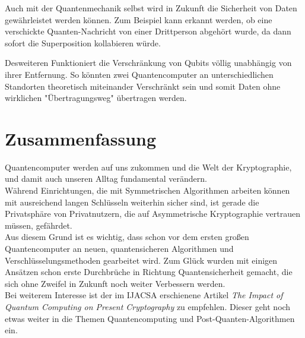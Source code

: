 \documentclass[12pt]{IEEEtran}
\begin{document}
Auch mit der Quantenmechanik selbst wird in Zukunft die Sicherheit von Daten gewährleistet werden können. Zum Beispiel kann erkannt werden, ob eine verschickte Quanten-Nachricht von einer Drittperson abgehört wurde, da dann sofort die Superposition kollabieren würde.

Desweiteren Funktioniert die Verschränkung von Qubits völlig unabhängig von ihrer Entfernung. So könnten zwei Quantencomputer an unterschiedlichen Standorten theoretisch miteinander Verschränkt sein und somit Daten ohne wirklichen "Übertragungsweg" übertragen werden. \cite{mavroeidis2018impact}

\section{Zusammenfassung}

Quantencomputer werden auf uns zukommen und die Welt der Kryptographie, und damit auch unseren Alltag fundamental verändern. \\

Während Einrichtungen, die mit Symmetrischen Algorithmen arbeiten können mit ausreichend langen Schlüsseln weiterhin sicher sind, ist gerade die Privatsphäre von Privatnutzern, die auf Asymmetrische Kryptographie vertrauen müssen, gefährdet. \\

Aus diesem Grund ist es wichtig, dass schon vor dem ersten großen Quantencomputer an neuen, quantensicheren Algorithmen und Verschlüsselungsmethoden gearbeitet wird. Zum Glück wurden mit einigen Ansätzen schon erste Durchbrüche in Richtung Quantensicherheit gemacht, die sich ohne Zweifel in Zukunft noch weiter Verbessern werden. \\

Bei weiterem Interesse ist der im IJACSA erschienene Artikel \textit{The Impact of Quantum Computing on Present Cryptography} \cite{mavroeidis2018impact} zu empfehlen. Dieser geht noch etwas weiter in die Themen Quantencomputing und Post-Quanten-Algorithmen ein. 



\end{document}
